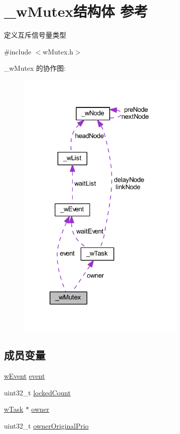 \hypertarget{struct__w_mutex}{}\section{\+\_\+w\+Mutex结构体 参考}
\label{struct__w_mutex}


定义互斥信号量类型  




{\ttfamily \#include $<$w\+Mutex.\+h$>$}



\+\_\+w\+Mutex 的协作图\+:
\nopagebreak
\begin{figure}[H]
\begin{center}
\leavevmode
\includegraphics[width=231pt]{struct__w_mutex__coll__graph}
\end{center}
\end{figure}
\subsection*{成员变量}
\begin{DoxyCompactItemize}
\item 
\mbox{\hyperlink{w_event_8h_af8b15988a26e1ac0d63eaf3fc5afe9d3}{w\+Event}} \mbox{\hyperlink{struct__w_mutex_ad737d3f95a5cf9ee457f37f1cedfa44a}{event}}
\item 
uint32\+\_\+t \mbox{\hyperlink{struct__w_mutex_a16598f387191bb413e5c802b23e501ef}{locked\+Count}}
\item 
\mbox{\hyperlink{w_task_8h_acd0e6238476f631a6ac4588629bac372}{w\+Task}} $\ast$ \mbox{\hyperlink{struct__w_mutex_a1ed47712ef6760f64988107466c22321}{owner}}
\item 
uint32\+\_\+t \mbox{\hyperlink{struct__w_mutex_aa1d8803bb70576a417cba7092640ebd3}{owner\+Original\+Prio}}
\end{DoxyCompactItemize}


